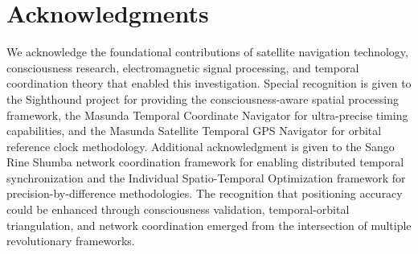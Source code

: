 \documentclass[12pt,a4paper]{article}
\begin{document}
\section*{Acknowledgments}
We acknowledge the foundational contributions of satellite navigation technology, consciousness research, electromagnetic signal processing, and temporal coordination theory that enabled this investigation. Special recognition is given to the Sighthound project for providing the consciousness-aware spatial processing framework, the Masunda Temporal Coordinate Navigator for ultra-precise timing capabilities, and the Masunda Satellite Temporal GPS Navigator for orbital reference clock methodology. Additional acknowledgment is given to the Sango Rine Shumba network coordination framework for enabling distributed temporal synchronization and the Individual Spatio-Temporal Optimization framework for precision-by-difference methodologies. The recognition that positioning accuracy could be enhanced through consciousness validation, temporal-orbital triangulation, and network coordination emerged from the intersection of multiple revolutionary frameworks.
\end{document}

